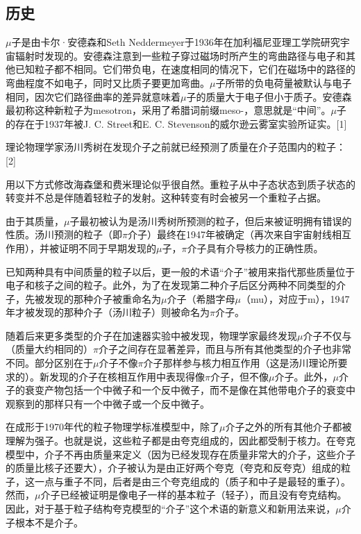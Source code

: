 \subsection{历史}
$\mu$子是由卡尔·安德森和Seth Neddermeyer于1936年在加利福尼亚理工学院研究宇宙辐射时发现的。安德森注意到一些粒子穿过磁场时所产生的弯曲路径与电子和其他已知粒子都不相同。它们带负电，在速度相同的情况下，它们在磁场中的路径的弯曲程度不如电子，同时又比质子要更加弯曲。$\mu$子所带的负电荷量被默认与电子相同，因次它们路径曲率的差异就意味着$\mu$子的质量大于电子但小于质子。安德森最初称这种新粒子为mesotron，采用了希腊词前缀meso-，意思就是“中间”。$\mu$子的存在于1937年被J. C. Street和E. C. Stevenson的威尔逊云雾室实验所证实。[1]

理论物理学家汤川秀树在发现介子之前就已经预测了质量在介子范围内的粒子：[2]

用以下方式修改海森堡和费米理论似乎很自然。重粒子从中子态状态到质子状态的转变并不总是伴随着轻粒子的发射。这种转变有时会被另一个重粒子占据。

由于其质量，$\mu$子最初被认为是汤川秀树所预测的粒子，但后来被证明拥有错误的性质。汤川预测的粒子（即$\pi$介子）最终在1947年被确定（再次来自宇宙射线相互作用），并被证明不同于早期发现的$\mu$子，$\pi$介子具有介导核力的正确性质。

已知两种具有中间质量的粒子以后，更一般的术语“介子”被用来指代那些质量位于电子和核子之间的粒子。此外，为了在发现第二种介子后区分两种不同类型的介子，先被发现的那种介子被重命名为$\mu$介子（希腊字母$\mu$（mu），对应于m），1947年才被发现的那种介子（汤川粒子）则被命名为$\pi$介子。

随着后来更多类型的介子在加速器实验中被发现，物理学家最终发现$\mu$介子不仅与（质量大约相同的）$\pi$介子之间存在显著差异，而且与所有其他类型的介子也非常不同。部分区别在于$\mu$介子不像$\pi$介子那样参与核力相互作用（这是汤川理论所要求的）。新发现的介子在核相互作用中表现得像$\pi$介子，但不像$\mu$介子。此外，$\mu$介子的衰变产物包括一个中微子和一个反中微子，而不是像在其他带电介子的衰变中观察到的那样只有一个中微子或一个反中微子。

在成形于1970年代的粒子物理学标准模型中，除了$\mu$介子之外的所有其他介子都被理解为强子。也就是说，这些粒子都是由夸克组成的，因此都受制于核力。在夸克模型中，介子不再由质量来定义（因为已经发现存在质量非常大的介子，这些介子的质量比核子还要大），介子被认为是由正好两个夸克（夸克和反夸克）组成的粒子，这一点与重子不同，后者是由三个夸克组成的（质子和中子是最轻的重子）。然而，$\mu$介子已经被证明是像电子一样的基本粒子（轻子），而且没有夸克结构。因此，对于基于粒子结构夸克模型的“介子”这个术语的新意义和新用法来说，$\mu$介子根本不是介子。


